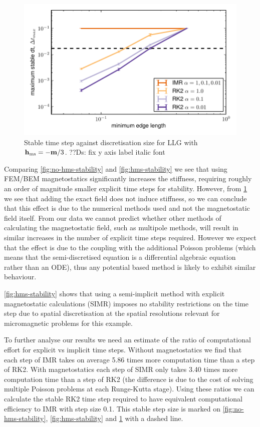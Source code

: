 \begin{figure}
  \centering
  \includegraphics[width=\textwidth]{images/stability_sphere}
  \caption{Stable time step against discretisation size for LLG with $\boldsymbol{\mathrm{h}}_{\text{ms}} = - \boldsymbol{\mathrm{m}} / 3$.
    ??Ds: fix y axis label italic font
  }
  \label{fig:analytic-hms-stability}
\end{figure}

Comparing \cref{fig:no-hms-stability} and \ref{fig:hms-stability} we see that using FEM/BEM magnetostatics significantly increases the stiffness, requiring roughly an order of magnitude smaller explicit time steps for stability.
However, from \cref{fig:analytic-hms-stability} we see that adding the exact field does not induce stiffness, so we can conclude that this effect is due to the numerical methods used and not the magnetostatic field itself.
From our data we cannot predict whether other methods of calculating the magnetostatic field, such as multipole methods, will result in similar increases in the number of explicit time steps required.
However we expect that the effect is due to the coupling with the additional Poisson problems (which means that the semi-discretised equation is a differential algebraic equation \cite[371]{HairerWanner} rather than an ODE), thus any potential based method is likely to exhibit similar behaviour.

\cref{fig:hms-stability} shows that using a semi-implicit method with explicit magnetostatic calculations (SIMR) imposes no stability restrictions on the time step due to spatial discretisation at the spatial resolutions relevant for micromagnetic problems for this example.

To further analyse our results we need an estimate of the ratio of computational effort for explicit vs implicit time steps. Without magnetostatics we find that each step of IMR takes on average 5.86 times more computation time than a step of RK2. With magnetostatics each step of SIMR only takes 3.40 times more computation time than a step of RK2 (the difference is due to the cost of solving multiple Poisson problems at each Runge-Kutta stage). Using these ratios we can calculate the stable RK2 time step required to have equivalent computational efficiency to IMR with step size 0.1. This stable step size is marked on \cref{fig:no-hms-stability}, \ref{fig:hms-stability} and \ref{fig:analytic-hms-stability} with a dashed line.

